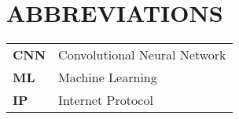 \chapter*{ABBREVIATIONS}
%
%
\begin{tabular}{l{1cm}l{5cm}} 
  \textbf{CNN} & Convolutional Neural Network \\ 
  \textbf{ML}& Machine Learning \\ 
  \textbf{IP} & Internet Protocol \\ 
\end{tabular}	




